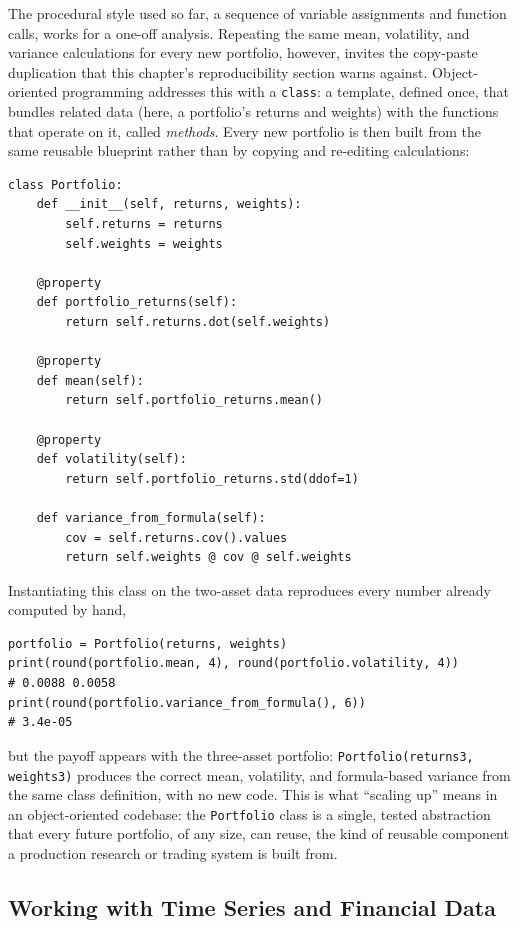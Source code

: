 \documentclass[../ai_in_finance]{subfiles}
\begin{document}
The procedural style used so far, a sequence of variable assignments and function calls, works for a one-off analysis. Repeating the same mean, volatility, and variance calculations for every new portfolio, however, invites the copy-paste duplication that this chapter's reproducibility section warns against.
Object-oriented programming addresses this with a \texttt{class}: a template, defined once, that bundles related data (here, a portfolio's returns and weights) with the functions that operate on it, called \emph{methods}. Every new portfolio is then built from the same reusable blueprint rather than by copying and re-editing calculations:

\begin{verbatim}
class Portfolio:
    def __init__(self, returns, weights):
        self.returns = returns
        self.weights = weights

    @property
    def portfolio_returns(self):
        return self.returns.dot(self.weights)

    @property
    def mean(self):
        return self.portfolio_returns.mean()

    @property
    def volatility(self):
        return self.portfolio_returns.std(ddof=1)

    def variance_from_formula(self):
        cov = self.returns.cov().values
        return self.weights @ cov @ self.weights
\end{verbatim}

Instantiating this class on the two-asset data reproduces every number already computed by hand,
\begin{verbatim}
portfolio = Portfolio(returns, weights)
print(round(portfolio.mean, 4), round(portfolio.volatility, 4))
# 0.0088 0.0058
print(round(portfolio.variance_from_formula(), 6))
# 3.4e-05
\end{verbatim}
but the payoff appears with the three-asset portfolio: \texttt{Portfolio(returns3, weights3)} produces the correct mean, volatility, and formula-based variance from the same class definition, with no new code.
This is what ``scaling up'' means in an object-oriented codebase: the \texttt{Portfolio} class is a single, tested abstraction that every future portfolio, of any size, can reuse, the kind of reusable component a production research or trading system is built from.

\subsection{Working with Time Series and Financial Data}
\end{document}
